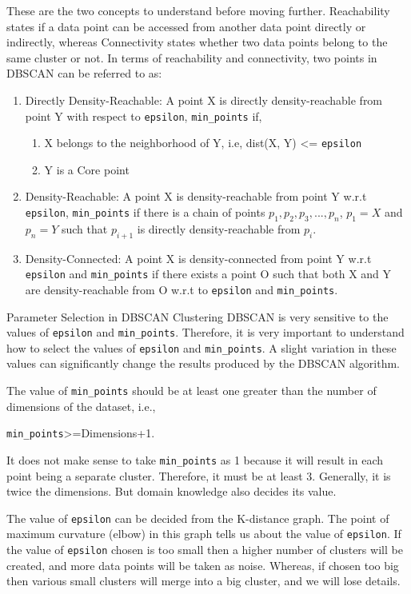 \documentclass[10pt,a4paper]{book}
\begin{document}
These are the two concepts to understand before moving further. Reachability states if a data point can be accessed from another data point directly or indirectly, whereas Connectivity states whether two data points belong to the same cluster or not. In terms of reachability and connectivity, two points in DBSCAN can be referred to as:
\begin{enumerate}
\item Directly Density-Reachable: A point X is directly density-reachable from point Y with respect to \verb-epsilon-, \verb-min_points- if,
\begin{enumerate}
\item X belongs to the neighborhood of Y, i.e, dist(X, Y) <= \verb-epsilon-
\item Y is a Core point
\end{enumerate}
\item Density-Reachable: A point X is density-reachable from point Y w.r.t \verb-epsilon-, \verb-min_points- if there is a chain of points $p_{1}, p_{2}, p_{3}, ..., p_{n}$,  $p_{1}=X$ and $p_{n}=Y$ such that $p_{i+1}$ is directly density-reachable from $p_{i}$.

\item Density-Connected: A point X is density-connected from point Y w.r.t \verb-epsilon- and \verb-min_points- if there exists a point O such that both X and Y are density-reachable from O w.r.t to \verb-epsilon- and \verb-min_points-.

\end{enumerate}

Parameter Selection in DBSCAN Clustering
DBSCAN is very sensitive to the values of \verb-epsilon- and \verb-min_points-. Therefore, it is very important to understand how to select the values of \verb-epsilon- and \verb-min_points-. A slight variation in these values can significantly change the results produced by the DBSCAN algorithm.

The value of \verb-min_points- should be at least one greater than the number of dimensions of the dataset, i.e., 

\verb-min_points->=Dimensions+1.

It does not make sense to take \verb-min_points- as 1 because it will result in each point being a separate cluster. Therefore, it must be at least 3. Generally, it is twice the dimensions. But domain knowledge also decides its value.

The value of \verb-epsilon- can be decided from the K-distance graph. The point of maximum curvature (elbow) in this graph tells us about the value of \verb-epsilon-. If the value of \verb-epsilon- chosen is too small then a higher number of clusters will be created, and more data points will be taken as noise. Whereas, if chosen too big then various small clusters will merge into a big cluster, and we will lose details.
\end{document}
